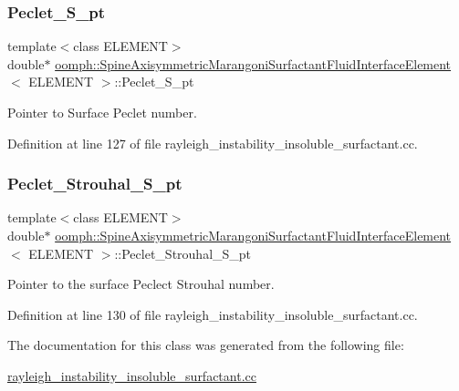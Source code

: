 \subsubsection{\texorpdfstring{Peclet\+\_\+\+S\+\_\+pt}{Peclet\_S\_pt}}
{\footnotesize\ttfamily template$<$class E\+L\+E\+M\+E\+NT$>$ \\
double$\ast$ \hyperlink{classoomph_1_1SpineAxisymmetricMarangoniSurfactantFluidInterfaceElement}{oomph\+::\+Spine\+Axisymmetric\+Marangoni\+Surfactant\+Fluid\+Interface\+Element}$<$ E\+L\+E\+M\+E\+NT $>$\+::Peclet\+\_\+\+S\+\_\+pt\hspace{0.3cm}{\ttfamily [private]}}



Pointer to Surface Peclet number. 



Definition at line 127 of file rayleigh\+\_\+instability\+\_\+insoluble\+\_\+surfactant.\+cc.

\mbox{\label{classoomph_1_1SpineAxisymmetricMarangoniSurfactantFluidInterfaceElement_a8e2a9a53bcc19471bcb36ed2c169fb57}} 
\subsubsection{\texorpdfstring{Peclet\+\_\+\+Strouhal\+\_\+\+S\+\_\+pt}{Peclet\_Strouhal\_S\_pt}}
{\footnotesize\ttfamily template$<$class E\+L\+E\+M\+E\+NT$>$ \\
double$\ast$ \hyperlink{classoomph_1_1SpineAxisymmetricMarangoniSurfactantFluidInterfaceElement}{oomph\+::\+Spine\+Axisymmetric\+Marangoni\+Surfactant\+Fluid\+Interface\+Element}$<$ E\+L\+E\+M\+E\+NT $>$\+::Peclet\+\_\+\+Strouhal\+\_\+\+S\+\_\+pt\hspace{0.3cm}{\ttfamily [private]}}



Pointer to the surface Peclect Strouhal number. 



Definition at line 130 of file rayleigh\+\_\+instability\+\_\+insoluble\+\_\+surfactant.\+cc.



The documentation for this class was generated from the following file\+:\begin{DoxyCompactItemize}
\item 
\hyperlink{rayleigh__instability__insoluble__surfactant_8cc}{rayleigh\+\_\+instability\+\_\+insoluble\+\_\+surfactant.\+cc}\end{DoxyCompactItemize}
